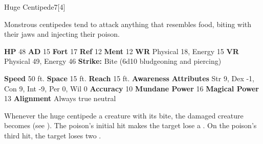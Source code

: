   \begin{monsection}{Huge Centipede}{7}[4]
    \vspace{-1em}\vspace{-1em}
    \vspace{0em}

    
    Monstrous centipedes tend to attack anything that resembles food, biting with their jaws and injecting their poison.
  
    

    \begin{spellcontent}
      \begin{spelltargetinginfo}
        \pari \textbf{HP} 48 \monsep
          \textbf{AD} 15 \monsep
          \textbf{Fort} 17 \monsep
          \textbf{Ref} 12 \monsep
          \textbf{Ment} 12
        \pari \textbf{WR} Physical 18, Energy 15 \monsep
        \textbf{VR} Physical 49, Energy 46
        \pari \textbf{Strike:}
            Bite  (6d10 bludgeoning and piercing)
      \end{spelltargetinginfo}
    \end{spellcontent}
    \begin{monsterfooter}
      \pari \textbf{Speed} 50 ft. \monsep
        \textbf{Space} 15 ft. \monsep
        \textbf{Reach} 15 ft.
      \pari \textbf{Awareness} 
      \pari \textbf{Attributes}
        Str 9, Dex -1,
        Con 9, Int -9,
        Per 0, Wil 0
      \pari \textbf{Accuracy} 10 \monsep
        \textbf{Mundane Power} 16 \monsep
      \textbf{Magical Power} 13
      \pari \textbf{Alignment} Always true neutral
    \end{monsterfooter}
  \end{monsection}
        Whenever the huge centipede  a creature with its bite,
          the damaged creature becomes  (see ).
        The poison's initial hit makes the target lose a .
        On the poison's third hit, the target loses two .
  
